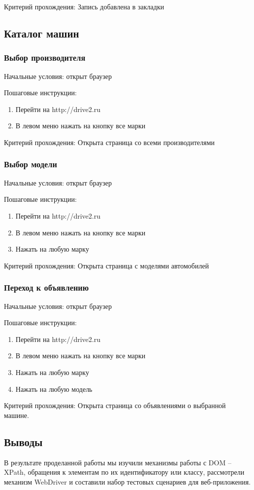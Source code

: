 Критерий прохождения: Запись добавлена в закладки

\subsection{Каталог машин}
\subsubsection{Выбор производителя}

Начальные условия: открыт браузер

Пошаговые инструкции:
\begin{enumerate}
\item Перейти на http://drive2.ru
\item В левом меню нажать на кнопку все марки
\end{enumerate}

Критерий прохождения: Открыта страница со всеми производителями
\subsubsection{Выбор модели}

Начальные условия: открыт браузер

Пошаговые инструкции:
\begin{enumerate}
\item Перейти на http://drive2.ru
\item В левом меню нажать на кнопку все марки
\item Нажать на любую марку
\end{enumerate}

Критерий прохождения: Открыта страница с моделями автомобилей
\subsubsection{Переход к объявлению}

Начальные условия: открыт браузер

Пошаговые инструкции:
\begin{enumerate}
\item Перейти на http://drive2.ru
\item В левом меню нажать на кнопку все марки
\item Нажать на любую марку
\item Нажать на любую модель
\end{enumerate}

Критерий прохождения: Открыта страница со объявлениями о выбранной машине.

\subsection{Выводы}
В результате проделанной работы мы изучили механизмы работы с DOM -- XPath,
обращения к элементам по их идентификатору или классу, рассмотрели механизм
WebDriver и составили набор тестовых сценариев для веб-приложения.


